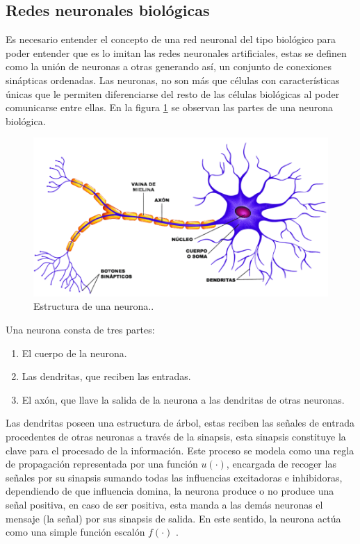 \documentclass[12pt,letterpaper,oneside,openright]{book}
\begin{document}
	\subsection{Redes neuronales biológicas}
	Es necesario entender el concepto de una red neuronal del tipo biológico para poder entender que es lo imitan las redes neuronales artificiales, estas se definen como la unión de neuronas a otras generando así, un conjunto de conexiones sinápticas ordenadas. Las neuronas, no son más que células con características únicas que le permiten diferenciarse del resto de las células biológicas al poder comunicarse entre ellas. En la figura \ref{fig:neurona} se observan las partes de una neurona biológica. 
	\begin{figure}[h]
		\centering
		\includegraphics[width=0.6\linewidth]{Sem_1/figuras/neurona}
		\caption{Estructura de una neurona.\cite{imaNeu}.}
		\label{fig:neurona}
	\end{figure}
	
	Una neurona consta de tres partes:
	\begin{enumerate}
		\item El cuerpo de la neurona.
		\item Las dendritas, que reciben las entradas.
		\item El axón, que llave la salida de la neurona a las dendritas de otras neuronas.
	\end{enumerate} 
	Las dendritas poseen una estructura de árbol, estas reciben las señales de entrada procedentes de otras neuronas a través de la sinapsis, esta sinapsis constituye la clave para el procesado de la información. Este proceso se modela como una regla de propagación representada por una función $u(\cdot)$, encargada de recoger las señales por su sinapsis sumando todas las influencias excitadoras e inhibidoras, dependiendo de que influencia domina, la neurona produce o no produce una señal positiva, en caso de ser positiva, esta manda a las demás neuronas el mensaje (la señal) por sus sinapsis de salida. En este sentido, la neurona actúa como una simple función escalón $f(\cdot)$ \cite{nnApli}.
	
\end{document}
